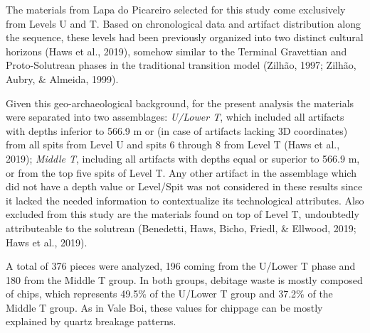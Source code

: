 \documentclass[12pt,twoside]{reedthesis}
\begin{document}
The materials from Lapa do Picareiro selected for this study come exclusively from Levels U and T. Based on chronological data and artifact distribution along the sequence, these levels had been previously organized into two distinct cultural horizons (Haws et al., 2019), somehow similar to the Terminal Gravettian and Proto-Solutrean phases in the traditional transition model (Zilhão, 1997; Zilhão, Aubry, \& Almeida, 1999).

Given this geo-archaeological background, for the present analysis the materials were separated into two assemblages: \emph{U/Lower T}, which included all artifacts with depths inferior to 566.9 m or (in case of artifacts lacking 3D coordinates) from all spits from Level U and spits 6 through 8 from Level T (Haws et al., 2019); \emph{Middle T}, including all artifacts with depths equal or superior to 566.9 m, or from the top five spits of Level T. Any other artifact in the assemblage which did not have a depth value or Level/Spit was not considered in these results since it lacked the needed information to contextualize its technological attributes. Also excluded from this study are the materials found on top of Level T, undoubtedly attributeable to the solutrean (Benedetti, Haws, Bicho, Friedl, \& Ellwood, 2019; Haws et al., 2019).

A total of 376 pieces were analyzed, 196 coming from the U/Lower T phase and 180 from the Middle T group. In both groups, debitage waste is mostly composed of chips, which represents 49.5\% of the U/Lower T group and 37.2\% of the Middle T group. As in Vale Boi, these values for chippage can be mostly explained by quartz breakage patterns.
\end{document}
